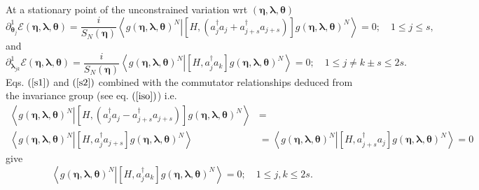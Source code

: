 \documentclass[aps,preprint]{revtex4}%
\begin{document}
At a stationary point of the unconstrained variation wrt $\left(
\mathbf{\eta},\mathbf{\lambda},\mathbf{\theta}\right)  $
\begin{equation}
\partial_{\mathbf{\theta}_{j}}^{1}\mathcal{E}\left(  \mathbf{\eta
},\mathbf{\lambda},\mathbf{\theta}\right)  =\frac{i}{S_{N}\left(
\mathbf{\eta}\right)  }\left\langle \left.  g\left(  \mathbf{\eta
},\mathbf{\lambda},\mathbf{\theta}\right)  ^{N}\right\vert \left[  H,\left(
a_{j}^{\dagger}a_{j}+a_{j+s}^{\dagger}a_{j+s}\right)  \right]  g\left(
\mathbf{\eta},\mathbf{\lambda},\mathbf{\theta}\right)  ^{N}\right\rangle
=0;\quad1\leq j\leq s, \label{s1}%
\end{equation}
and%
\begin{equation}
\partial_{\mathbf{\lambda}_{jk}}^{1}\mathcal{E}\left(  \mathbf{\eta
},\mathbf{\lambda},\mathbf{\theta}\right)  =\frac{i}{S_{N}\left(
\mathbf{\eta}\right)  }\left\langle \left.  g\left(  \mathbf{\eta
},\mathbf{\lambda},\mathbf{\theta}\right)  ^{N}\right\vert \left[
H,a_{j}^{\dagger}a_{k}\right]  g\left(  \mathbf{\eta},\mathbf{\lambda
},\mathbf{\theta}\right)  ^{N}\right\rangle =0;\quad1\leq j\neq k\pm s\leq2s.
\label{s2}%
\end{equation}
Eqs. $\left(  \ref{s1}\right)  $ and $\left(  \ref{s2}\right)  $ combined with
the commutator relationships deduced from the invariance group (see eq.
$\left(  \ref{iso}\right)  $) i.e.
\begin{align}
\left\langle \left.  g\left(  \mathbf{\eta},\mathbf{\lambda},\mathbf{\theta
}\right)  ^{N}\right\vert \left[  H,\left(  a_{j}^{\dagger}a_{j}%
-a_{j+s}^{\dagger}a_{j+s}\right)  \right]  g\left(  \mathbf{\eta
},\mathbf{\lambda},\mathbf{\theta}\right)  ^{N}\right\rangle  &  =\nonumber\\
\left\langle \left.  g\left(  \mathbf{\eta},\mathbf{\lambda},\mathbf{\theta
}\right)  ^{N}\right\vert \left[  H,a_{j}^{\dagger}a_{j+s}\right]  g\left(
\mathbf{\eta},\mathbf{\lambda},\mathbf{\theta}\right)  ^{N}\right\rangle  &
=\left\langle \left.  g\left(  \mathbf{\eta},\mathbf{\lambda},\mathbf{\theta
}\right)  ^{N}\right\vert \left[  H,a_{j+s}^{\dagger}a_{j}\right]  g\left(
\mathbf{\eta},\mathbf{\lambda},\mathbf{\theta}\right)  ^{N}\right\rangle =0
\end{align}
give
\begin{equation}
\left\langle \left.  g\left(  \mathbf{\eta},\mathbf{\lambda},\mathbf{\theta
}\right)  ^{N}\right\vert \left[  H,a_{j}^{\dagger}a_{k}\right]  g\left(
\mathbf{\eta},\mathbf{\lambda},\mathbf{\theta}\right)  ^{N}\right\rangle
=0;\quad1\leq j,k\leq2s. \label{s3}%
\end{equation}
\end{document}
